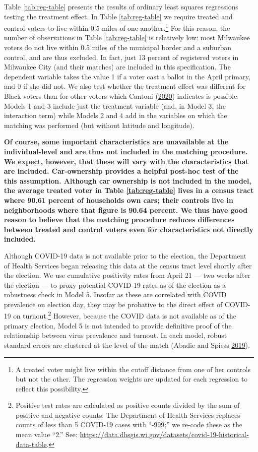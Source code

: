 \documentclass[
  12pt,
]{article}
\begin{document}
Table \ref{tab:reg-table} presents the results of ordinary least squares regressions testing the treatment effect. In Table \ref{tab:reg-table} we require treated and control voters to live within 0.5 miles of one another.\footnote{A treated voter might live within the cutoff distance from one of her controls but not the other. The regression weights are updated for each regression to reflect this possibility.} For this reason, the number of observations in Table \ref{tab:reg-table} is relatively low: most Milwaukee voters do not live within 0.5 miles of the municipal border and a suburban control, and are thus excluded. In fact, just 13 percent of registered voters in Milwaukee City (and their matches) are included in this specification. The dependent variable takes the value 1 if a voter cast a ballot in the April primary, and 0 if she did not. We also test whether the treatment effect was different for Black voters than for other voters which Cantoni (\protect\hyperlink{ref-Cantoni2020}{2020}) indicates is possible. Models 1 and 3 include just the treatment variable (and, in Model 3, the interaction term) while Models 2 and 4 add in the variables on which the matching was performed (but without latitude and longitude).

\textbf{Of course, some important characteristics are unavailable at the individual-level and are thus not included in the matching procedure. We expect, however, that these will vary with the characteristics that are included. Car-ownership provides a helpful post-hoc test of the this assumption. Although car ownership is not included in the model, the average treated voter in Table \ref{tab:reg-table} lives in a census tract where 90.61 percent of households own cars; their controls live in neighborhoods where that figure is 90.64 percent. We thus have good reason to believe that the matching procedure reduces differences between treated and control voters even for characteristics not directly included.}

Although COVID-19 data is not available prior to the election, the Department of Health Services began releasing this data at the census tract level shortly after the election. We use cumulative positivity rates from April 21 --- two weeks after the election --- to proxy potential COVID-19 rates as of the election as a robustness check in Model 5. Insofar as these are correlated with COVID prevalence on election day, they may be probative to the direct effect of COVID-19 on turnout.\footnote{Positive test rates are calculated as positive counts divided by the sum of positive and negative counts. The Department of Health Services replaces counts of less than 5 COVID-19 cases with ``-999;'' we re-code these as the mean value ``2.'' See: \url{https://data.dhsgis.wi.gov/datasets/covid-19-historical-data-table}.} However, because the COVID data is not available as of the primary election, Model 5 is not intended to provide definitive proof of the relationship between virus prevalence and turnout. In each model, robust standard errors are clustered at the level of the match (Abadie and Spiess \protect\hyperlink{ref-Abadie2019}{2019}).
\end{document}
